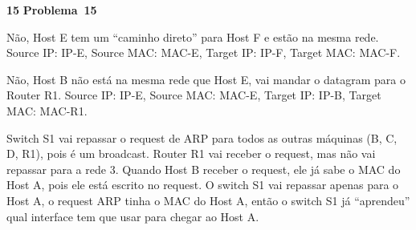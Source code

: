 \documentclass{article}
\newcounter{exe-list}
\newenvironment{exe-list}
    {\begin{list}{\alph{exe-list}.}{\usecounter{exe-list}}}
    {\end{list}}
\newenvironment{exe}[2][Problema]
    {\newcommand{\opt}{(Opcional)}%
    \newcommand{\sketch}[1]{{\bfseries Rascunho:} ##1}%
    \medskip\par\noindent\ifthenelse{\equal{#1}{}}
        {\textbf{\large #2}}
        {\textbf{\large #1~#2}}%
    \medskip\par\noindent}
    {\medskip}
\begin{document}
\begin{exe}{15}
    \begin{exe-list}
    \item
        Não, Host E tem um ``caminho direto'' para Host F e
        estão na mesma rede.
        Source IP: IP-E, Source MAC: MAC-E,
        Target IP: IP-F, Target MAC: MAC-F.
    \item
        Não, Host B não está na mesma rede que Host E,
        vai mandar o datagram para o Router R1.
        Source IP: IP-E, Source MAC: MAC-E,
        Target IP: IP-B, Target MAC: MAC-R1.
    \item
        Switch S1 vai repassar o request de ARP para
        todos as outras máquinas (B, C, D, R1),
        pois é um broadcast.
        Router R1 vai receber o request,
        mas não vai repassar para a rede 3.
        Quando Host B receber o request,
        ele já sabe o MAC do Host A,
        pois ele está escrito no request.
        O switch S1 vai repassar apenas para o Host A,
        o request ARP tinha o MAC do Host A,
        então o switch S1 já ``aprendeu''
        qual interface tem que usar para chegar ao Host A.
    \end{exe-list}
\end{exe}
\end{document}
